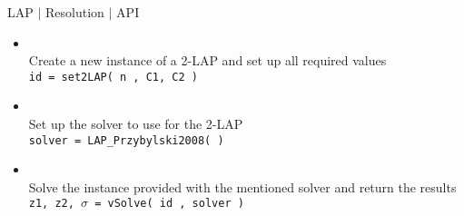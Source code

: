 %
% 
\begin{frame}{LAP $\mid$ Resolution $\mid$ API}

\begin{itemize}
\item  {}\\
          Create a new instance of a 2-LAP and set up all required values    \\
           \texttt{id = \texttt{{set2}LAP( n , C1, C2 ) }} 
           \medskip
\item  {} \\
          Set up the solver to use for the 2-LAP\\
          \texttt{solver = LAP\_Przybylski2008( ) }
          \medskip
\item  {}\\
          Solve the instance provided with the mentioned solver and return the results \\
          \texttt{z1, z2, $\sigma$ = vSolve( id , solver ) }
\end{itemize}

\end{frame}

